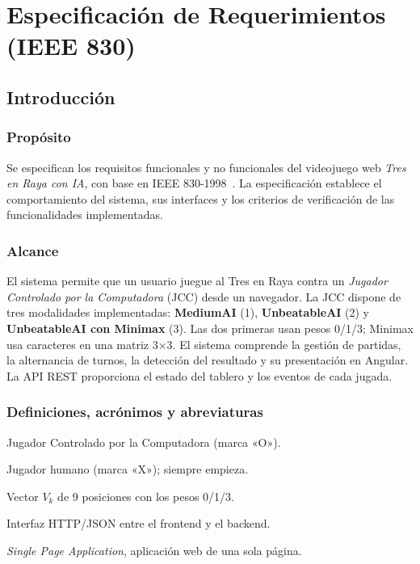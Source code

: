 \documentclass[12pt,a4paper]{article}
\begin{document}
\section{Especificación de Requerimientos (IEEE 830)}

\subsection{Introducción}

\subsubsection{Propósito}
Se especifican los requisitos funcionales y no funcionales del videojuego web
\emph{Tres en Raya con IA}, con base en IEEE 830-1998~\cite{ieee830}. La
especificación establece el comportamiento del sistema, sus interfaces y los
criterios de verificación de las funcionalidades implementadas.

\subsubsection{Alcance}
El sistema permite que un usuario juegue al Tres en Raya contra un
\emph{Jugador Controlado por la Computadora} (JCC) desde un navegador. La
JCC dispone de tres modalidades implementadas: \textbf{MediumAI} (1),
\textbf{UnbeatableAI} (2) y \textbf{UnbeatableAI con Minimax} (3). Las dos primeras
usan pesos 0/1/3; Minimax usa caracteres en una matriz 3$\times$3. El sistema
comprende la gestión de partidas, la alternancia de turnos, la detección del
resultado y su presentación en Angular. La API REST proporciona el estado del
tablero y los eventos de cada jugada.

\subsubsection{Definiciones, acrónimos y abreviaturas}
\begin{description}[leftmargin=2.6cm,style=nextline]
  \item[JCC] Jugador Controlado por la Computadora (marca «O»).
  \item[Usuario] Jugador humano (marca «X»); siempre empieza.
  \item[mArrayMoves] Vector $V_k$ de 9 posiciones con los pesos 0/1/3.
  \item[API REST] Interfaz HTTP/JSON entre el frontend y el backend.
  \item[SPA] \emph{Single Page Application}, aplicación web de una sola página.
\end{description}
\end{document}
